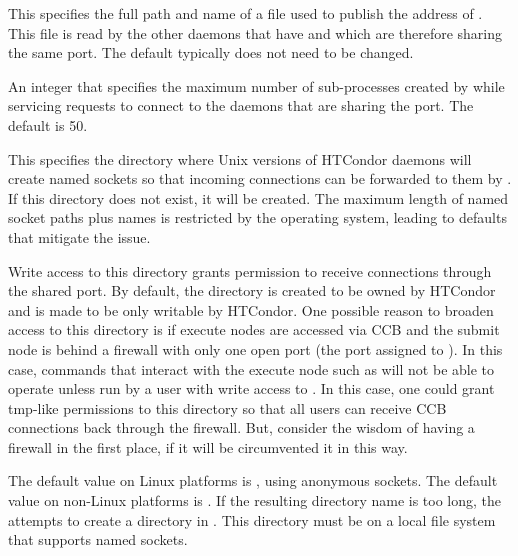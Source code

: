 \begin{description}

\label{param:SharedPortDaemonAdFile}
\item[\Macro{SHARED\_PORT\_DAEMON\_AD\_FILE}]
  This specifies the full path and name of a file used to publish the
  address of .  This file is read by the other
  daemons that have  and which are therefore
  sharing the same port.  The default typically does not need to be changed.

\label{param:SharedPortMaxWorkers}
\item[\Macro{SHARED\_PORT\_MAX\_WORKERS}] An integer that specifies
 the maximum number of sub-processes created by 
 while servicing requests to connect to the daemons that are sharing the port.
 The default is 50.

\label{param:DaemonSocketDir}
\item[\Macro{DAEMON\_SOCKET\_DIR}] This specifies the directory where
  Unix versions of HTCondor daemons will create named sockets so that incoming
  connections can be forwarded to them by .  If
  this directory does not exist, it will be created. The maximum length
  of named socket paths plus names is restricted by the operating system,
  leading to defaults that mitigate the issue.

  Write access to this directory grants permission to receive
  connections through the shared port.  By default, the directory is
  created to be owned by HTCondor and is made to be only writable by
  HTCondor.  One possible reason to broaden access to this directory is
  if execute nodes are accessed via CCB and the submit node is behind a
  firewall with only one open port (the port assigned to
  ).  In this case, commands that interact with
  the execute node such as  will not be able to
  operate unless run by a user with write access to
  .  In this case, one could grant
  tmp-like permissions to this directory so that all users can receive
  CCB connections back through the firewall.
  But, consider the wisdom of having a firewall in the first place,
  if it will be circumvented it in this way.

  The default value on Linux platforms is ,
  using anonymous sockets.
  The default value on non-Linux platforms is .
  If the resulting directory name is too long,
  the  attempts to create a directory in . 
  This directory must be on a local file system that supports named sockets.


\end{description}
